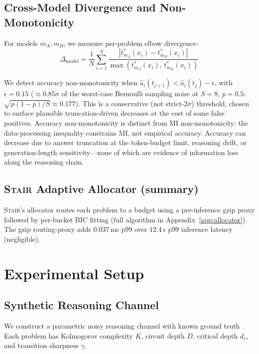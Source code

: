 \documentclass{article}
\newcommand{\method}{\textsc{Stair}}
\begin{document}
\subsection{Cross-Model Divergence and Non-Monotonicity}

For models $m_A, m_B$, we measure per-problem elbow divergence:
\begin{equation}
\Delta_{\text{model}} = \frac{1}{N}\sum_{i=1}^{N} \frac{|t^*_{m_A}(x_i) - t^*_{m_B}(x_i)|}{\max(t^*_{m_A}(x_i),\, t^*_{m_B}(x_i))}
\label{eq:divergence}
\end{equation}

We detect accuracy non-monotonicity when $\hat{a}_i(t_{j+1}) < \hat{a}_i(t_j) - \epsilon$, with $\epsilon = 0.15$ ($\approx 0.85\sigma$ of the worst-case Bernoulli sampling noise at $S{=}8$, $p{=}0.5$: $\sqrt{p(1{-}p)/S} \approx 0.177$).  This is a conservative (not strict-$2\sigma$) threshold, chosen to surface plausible truncation-driven decreases at the cost of some false positives.  Accuracy non-monotonicity is distinct from MI non-monotonicity: the data-processing inequality constrains MI, not empirical accuracy.  Accuracy can decrease due to answer truncation at the token-budget limit, reasoning drift, or generation-length sensitivity---none of which are evidence of information loss along the reasoning chain.

\subsection{\method{} Adaptive Allocator (summary)}
\method{}'s allocator routes each problem to a budget using a pre-inference gzip proxy followed by per-bucket BIC fitting (full algorithm in Appendix~\ref{app:allocator}). The gzip routing-proxy adds $0.037$\,ms p99 over $12.4$\,s p99 inference latency (negligible).

\section{Experimental Setup}
\label{sec:setup}

\subsection{Synthetic Reasoning Channel}

We construct a parametric noisy reasoning channel with known ground truth~\citep{polyanskiy2024it}.  Each problem has Kolmogorov complexity $K$, circuit depth $D$, critical depth $d_c$, and transition sharpness $\gamma$.
\end{document}
